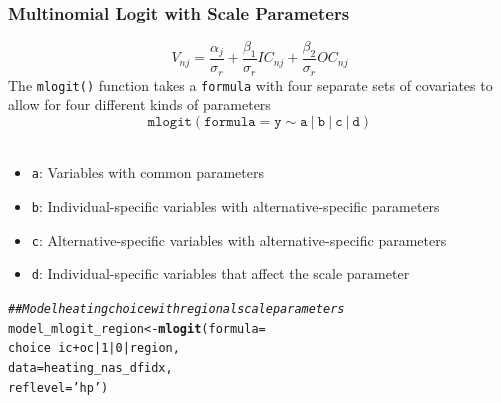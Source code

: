 \documentclass{beamer}\usepackage[]{graphicx}\usepackage[]{xcolor}
\makeatletter
\newcommand{\hlnum}[1]{\textcolor[rgb]{0.686,0.059,0.569}{#1}}%
\newcommand{\hlstr}[1]{\textcolor[rgb]{0.192,0.494,0.8}{#1}}%
\newcommand{\hlcom}[1]{\textcolor[rgb]{0.678,0.584,0.686}{\textit{#1}}}%
\newcommand{\hlopt}[1]{\textcolor[rgb]{0,0,0}{#1}}%
\newcommand{\hlstd}[1]{\textcolor[rgb]{0.345,0.345,0.345}{#1}}%
\newcommand{\hlkwb}[1]{\textcolor[rgb]{0.69,0.353,0.396}{#1}}%
\newcommand{\hlkwc}[1]{\textcolor[rgb]{0.333,0.667,0.333}{#1}}%
\newcommand{\hlkwd}[1]{\textcolor[rgb]{0.737,0.353,0.396}{\textbf{#1}}}%
\newenvironment{kframe}{%
 \def\at@end@of@kframe{}%
 \ifinner\ifhmode%
  \def\at@end@of@kframe{\end{minipage}}%
  \begin{minipage}{\columnwidth}%
 \fi\fi%
 \def\FrameCommand##1{\hskip\@totalleftmargin \hskip-\fboxsep
 \colorbox{shadecolor}{##1}\hskip-\fboxsep
     \hskip-\linewidth \hskip-\@totalleftmargin \hskip\columnwidth}%
 \MakeFramed {\advance\hsize-\width
   \@totalleftmargin\z@ \linewidth\hsize
   \@setminipage}}%
 {\par\unskip\endMakeFramed%
 \at@end@of@kframe}
\newenvironment{knitrout}{}{} %
\makeatother
\begin{document}
\begin{frame}[fragile]\frametitle{Multinomial Logit with Scale Parameters}
    \vspace{-1ex}
    $$V_{nj} = \frac{\alpha_j}{\sigma_r} + \frac{\beta_1}{\sigma_r} IC_{nj} + \frac{\beta_2}{\sigma_r} OC_{nj}$$
    The \texttt{mlogit()} function takes a \texttt{formula} with four separate sets of covariates to allow for four different kinds of parameters
    $$\mathtt{mlogit(formula = y \sim a ~|~ b ~|~ c ~|~ d)}$$ \\
    \begin{itemize}
    	\item \texttt{a}: Variables with common parameters
    	\item \texttt{b}: Individual-specific variables with alternative-specific parameters
    	\item \texttt{c}: Alternative-specific variables with alternative-specific parameters
    	\item \texttt{d}: Individual-specific variables that affect the scale parameter
    \end{itemize}
\begin{knitrout}\footnotesize
{}\color{fgcolor}\begin{kframe}
\begin{alltt}
\hlcom{## Model heating choice with regional scale parameters}
\hlstd{model_mlogit_region} \hlkwb{<-} \hlkwd{mlogit}\hlstd{(}\hlkwc{formula} \hlstd{=}
                                \hlstd{choice} \hlopt{~} \hlstd{ic} \hlopt{+} \hlstd{oc} \hlopt{|} \hlnum{1} \hlopt{|} \hlnum{0} \hlopt{|} \hlstd{region,}
                              \hlkwc{data} \hlstd{= heating_nas_dfidx,}
                              \hlkwc{reflevel} \hlstd{=} \hlstr{'hp'}\hlstd{)}
\end{alltt}
\end{kframe}
\end{knitrout}
\end{frame}
\end{document}
